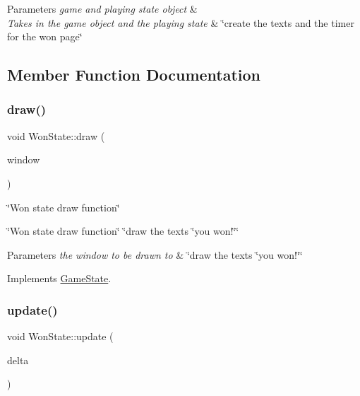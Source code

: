 \begin{DoxyParams}{Parameters}
{\em game and playing state object} & \\
\hline
{\em Takes in the game object and the playing state} & \char`\"{}create the texts and the timer for the won page\char`\"{} \\
\hline
\end{DoxyParams}


\subsection{Member Function Documentation}
\mbox{\label{classWonState_ad3c7505c55d3d21aae48a64707d34f8b}} 
\subsubsection{\texorpdfstring{draw()}{draw()}}
{\footnotesize\ttfamily void Won\+State\+::draw (\begin{DoxyParamCaption}\item[{sf\+::\+Render\+Window \&}]{window }\end{DoxyParamCaption})\hspace{0.3cm}{\ttfamily [virtual]}}



\char`\"{}\+Won state draw function\char`\"{} 

\char`\"{}\+Won state draw function\char`\"{}  \char`\"{}draw the texts \char`\"{}you won!\char`\"{}\char`\"{}


\begin{DoxyParams}{Parameters}
{\em the window to be drawn to} & \char`\"{}draw the texts \char`\"{}you won!\char`\"{}\char`\"{} \\
\hline
\end{DoxyParams}


Implements \hyperlink{classGameState_a3131198be0dee9ad887fc48a02d626e3}{Game\+State}.

\mbox{\label{classWonState_a81880fd5e0c94b8d477ba747a23bd475}} 
\subsubsection{\texorpdfstring{update()}{update()}}
{\footnotesize\ttfamily void Won\+State\+::update (\begin{DoxyParamCaption}\item[{sf\+::\+Time}]{delta }\end{DoxyParamCaption})\hspace{0.3cm}{\ttfamily [virtual]}}



